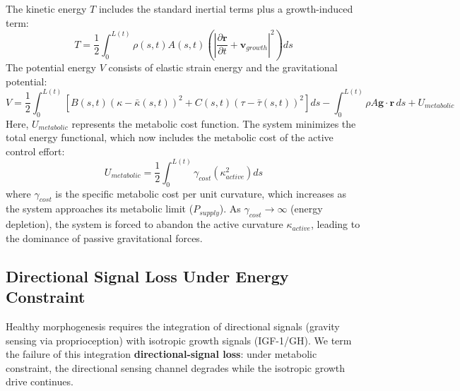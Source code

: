 The kinetic energy $T$ includes the standard inertial terms plus a growth-induced term:
\begin{equation}
T = \frac{1}{2} \int_0^{L(t)} \rho(s,t) A(s,t) \left( \left| \frac{\partial \mathbf{r}}{\partial t} + \mathbf{v}_{growth} \right|^2 \right) ds
\end{equation}
The potential energy $V$ consists of elastic strain energy and the gravitational potential:
\begin{equation}
V = \frac{1}{2} \int_0^{L(t)} \left[ B(s,t) (\kappa - \bar{\kappa}(s,t))^2 + C(s,t) (\tau - \bar{\tau}(s,t))^2 \right] ds - \int_0^{L(t)} \rho A \mathbf{g} \cdot \mathbf{r} \, ds + U_{metabolic}
\end{equation}
Here, $U_{metabolic}$ represents the metabolic cost function. The system minimizes the total energy functional, which now includes the metabolic cost of the active control effort:
\begin{equation}
U_{metabolic} = \frac{1}{2} \int_0^{L(t)} \gamma_{cost} \left( \kappa_{active}^2 \right) ds
\end{equation}
where $\gamma_{cost}$ is the specific metabolic cost per unit curvature, which increases as the system approaches its metabolic limit ($P_{supply}$). As $\gamma_{cost} \to \infty$ (energy depletion), the system is forced to abandon the active curvature $\kappa_{active}$, leading to the dominance of passive gravitational forces.

\subsection{Directional Signal Loss Under Energy Constraint}

Healthy morphogenesis requires the integration of directional signals (gravity sensing via proprioception) with isotropic growth signals (IGF-1/GH). We term the failure of this integration \textbf{directional-signal loss}: under metabolic constraint, the directional sensing channel degrades while the isotropic growth drive continues.

